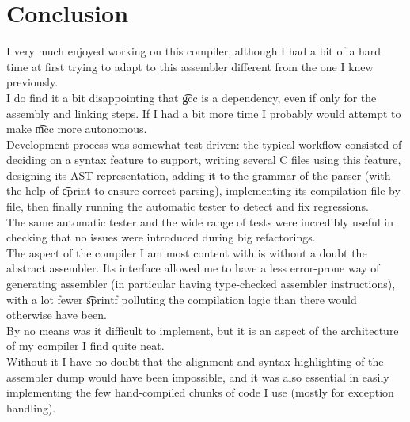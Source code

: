 \section{Conclusion}
I very much enjoyed working on this compiler, although I had a bit of a hard time at first trying to adapt to this assembler different from the one I knew previously.\\
I do find it a bit disappointing that \t{gcc} is a dependency, even if only for the assembly and linking steps. If I had a bit more time I probably would attempt to make \t{mcc} more autonomous.\\

Development process was somewhat test-driven: the typical workflow consisted of deciding on a syntax feature to support, writing several C files using this feature, designing its AST representation, adding it to the grammar of the parser (with the help of \t{cprint} to ensure correct parsing), implementing its compilation file-by-file, then finally running the automatic tester to detect and fix regressions.\\
The same automatic tester and the wide range of tests were incredibly useful in checking that no issues were introduced during big refactorings.\\

The aspect of the compiler I am most content with is without a doubt the abstract assembler. Its interface allowed me to have a less error-prone way of generating assembler (in particular having type-checked assembler instructions), with a lot fewer \t{sprintf} polluting the compilation logic than there would otherwise have been.\\
By no means was it difficult to implement, but it is an aspect of the architecture of my compiler I find quite neat. \\
Without it I have no doubt that the alignment and syntax highlighting of the assembler dump would have been impossible, and it was also essential in easily implementing the few hand-compiled chunks of code I use (mostly for exception handling).
